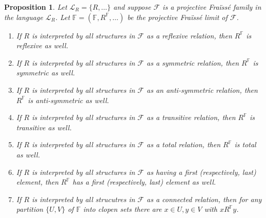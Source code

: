 \documentclass[12pt,twoside,a4paper]{amsart}
\theoremstyle{plain}
\newtheorem{proposition}[theorem]{Proposition}
\theoremstyle{definition}
\begin{document}
\begin{proposition} \label{arflessivsimetric}
Let $ \mathcal L_R=\{ R,\ldots\} $ and suppose $ \mathcal F $ is a projective Fra\"iss\'e family in the language $ \mathcal L_R$.
Let $ \mathbb F =( \mathbb F ,R^{ \mathbb F },\ldots )$ be the projective Fra\"iss\'e limit of $ \mathcal F $.
\begin{enumerate}
\item If $R$ is interpreted by all structures in $ \mathcal F $ as a reflexive relation, then $R^{ \mathbb F }$ is reflexive as well.
\item If $R$ is interpreted by all structures in $ \mathcal F $ as a symmetric relation, then $R^{ \mathbb F }$ is symmetric as well.
\item If $R$ is interpreted by all structures in $ \mathcal F $ as an anti-symmetric relation, then $R^{ \mathbb F }$ is anti-symmetric as well.
\item If $R$ is interpreted by all structures in $ \mathcal F $ as a transitive relation, then $R^{ \mathbb F }$ is transitive as well.
\item If $R$ is interpreted by all structures in $ \mathcal F $ as a total relation, then $R^{ \mathbb F } $ is total as well.
\item If $R$ is interpreted by all structures in $ \mathcal F $ as having a first (respectively, last) element, then $R^{ \mathbb F }$ has a first (respectively, last) element as well.
\item If $R$ is interpreted by all strucutres in $ \mathcal F $ as a connected relation, then for any partition $\{ U,V\} $ of $ \mathbb F $ into clopen sets there are $x\in U,y\in V$ with $xR^{ \mathbb F }y$.
\end{enumerate}
\end{proposition}
\end{document}
